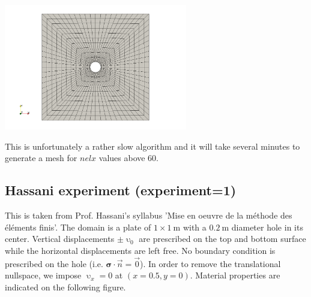 \begin{center}
\includegraphics[width=8cm]{python_codes/fieldstone_124/results/mesh2}
\end{center}

This is unfortunately a rather slow algorithm and it will take 
several minutes to generate a mesh for $nelx$ values above 60.

\newpage
\subsection*{Hassani experiment (experiment=1)}

This is taken from Prof. Hassani's syllabus 'Mise en oeuvre de la m\'ethode des \'el\'ements finis'.
The domain is a plate of $1\times 1~\si{\meter}$ with a $0.2~\si{\meter}$ diameter hole in its center.
Vertical displacements $\pm \upupsilon_0$ are prescribed on the top and bottom surface while 
the horizontal displacements are left free. No boundary condition is prescribed on the hole (i.e.
${\bm \sigma}\cdot \vec{n}=\vec{0}$).
In order to remove the translational nullspace, we impose $\upupsilon_x=0$
at $(x=0.5,y=0)$. Material properties are indicated on the following figure.

